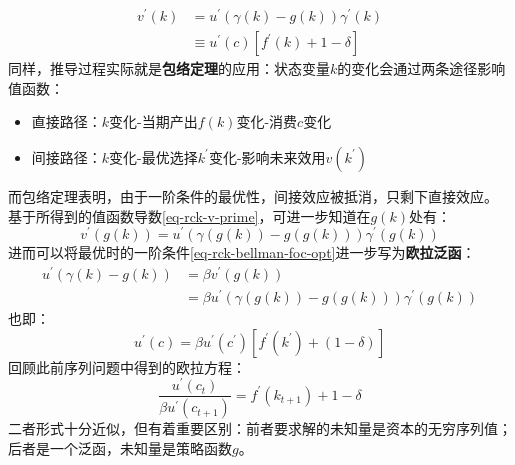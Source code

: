\begin{equation}    \label{eq-rck-v-prime}
    \begin{aligned}
        v^{\prime}\left(k\right) &= 
            u^{\prime}\left(\gamma\left(k\right)-g\left(k\right)\right)\gamma^{\prime}\left(k\right) \\
        &\equiv u^{\prime}\left(c\right)\left[f^{\prime}\left(k\right)+1-\delta\right] 
    \end{aligned}
\end{equation}
同样，推导过程实际就是\textbf{包络定理}的应用：状态变量$k$的变化会通过两条途径影响值函数：
\begin{itemize}
    \item 直接路径：$k$变化-当期产出$f\left(k\right)$变化-消费$c$变化
    \item 间接路径：$k$变化-最优选择$k^{\prime}$变化-影响未来效用$v\left(k^{\prime}\right)$
\end{itemize}
而包络定理表明，由于一阶条件的最优性，间接效应被抵消，只剩下直接效应。
基于所得到的值函数导数\cref{eq-rck-v-prime}，可进一步知道在$g(k)$处有：
\begin{equation*}
    v^{\prime}\left(g(k)\right) = 
        u^{\prime}\left(\gamma\left(g(k)\right)-g\left(g(k)\right)\right)\gamma^{\prime}\left(g(k)\right)
\end{equation*}
进而可以将最优时的一阶条件\cref{eq-rck-bellman-foc-opt}进一步写为\textbf{欧拉泛函}：
\begin{equation}   \label{eq-rck-euler-fe}
    \begin{aligned}
        u^{\prime}\left(\gamma\left(k\right)-g\left(k\right)\right) &= 
            \beta v^{\prime}\left(g\left(k\right)\right) \\
        &= \beta u^{\prime}\left(\gamma\left(g\left(k\right)\right)-g\left(g\left(k\right)\right)\right)
            \gamma^{\prime}\left(g\left(k\right)\right)
    \end{aligned}
\end{equation}
也即：
\begin{equation*}
    u^{\prime}\left(c\right)=\beta u^{\prime}\left(c^{\prime}\right)
        \left[f^{\prime}\left(k^{\prime}\right)+\left(1-\delta\right)\right]
\end{equation*}
回顾此前序列问题中得到的欧拉方程：
\begin{equation*}
    \frac{u^{\prime}\left(c_t\right)}{\beta u^{\prime}\left(c_{t+1}\right)}=f^{\prime}\left(k_{t+1}\right)+1-\delta
\end{equation*}
二者形式十分近似，但有着重要区别：前者要求解的未知量是资本的无穷序列值；后者是一个泛函，未知量是策略函数$g$。

